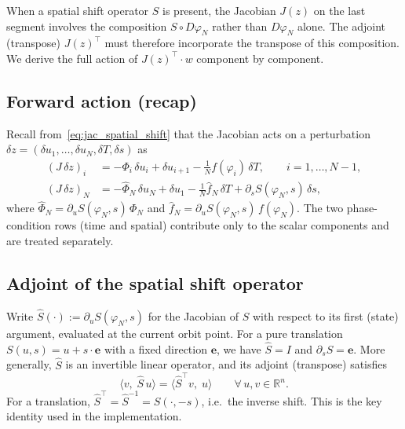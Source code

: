 \documentclass[11pt,a4paper]{article}
\begin{document}
When a spatial shift operator $S$ is present, the Jacobian $J(z)$ on the last segment
involves the composition $S \circ D\varphi_N$ rather than $D\varphi_N$ alone.  The adjoint
(transpose) $J(z)^\top$ must therefore incorporate the transpose of this composition.
We derive the full action of $J(z)^\top \cdot w$ component by component.

\subsection{Forward action (recap)}

Recall from~\eqref{eq:jac_spatial_shift} that the Jacobian acts on a perturbation
$\delta z = (\delta u_1, \dots, \delta u_N, \delta T, \delta s)$ as
\begin{align}
    (J\,\delta z)_i &= -\Phi_i\,\delta u_i + \delta u_{i+1}
                       - \tfrac{1}{N}f(\varphi_i)\,\delta T,
                       \qquad i = 1,\dots,N-1, \label{eq:jfw_inner} \\[4pt]
    (J\,\delta z)_N &= -\widehat{\Phi}_N\,\delta u_N + \delta u_1
                       - \tfrac{1}{N}\widehat{f}_N\,\delta T
                       + \partial_s S(\varphi_N,s)\,\delta s, \label{eq:jfw_last}
\end{align}
where $\widehat{\Phi}_N = \partial_u S(\varphi_N,s)\,\Phi_N$ and
$\widehat{f}_N = \partial_u S(\varphi_N,s)\,f(\varphi_N)$.  The two phase-condition
rows (time and spatial) contribute only to the scalar components and are treated
separately.

\subsection{Adjoint of the spatial shift operator}

Write $\widehat{S}(\cdot) := \partial_u S(\varphi_N, s)$ for the Jacobian of $S$
with respect to its first (state) argument, evaluated at the current orbit point.
For a pure translation $S(u,s) = u + s\cdot\mathbf{e}$ with a fixed direction
$\mathbf{e}$, we have $\widehat{S} = I$ and $\partial_s S = \mathbf{e}$.
More generally, $\widehat{S}$ is an invertible linear operator, and its
adjoint (transpose) satisfies
\begin{equation}
    \bigl\langle v,\; \widehat{S}\,u \bigr\rangle
    = \bigl\langle \widehat{S}^{\top} v,\; u \bigr\rangle
    \qquad \forall\, u,v \in \mathbb{R}^n.
\end{equation}
For a translation, $\widehat{S}^{\top} = \widehat{S}^{-1} = S(\cdot, -s)$, i.e.\ the
inverse shift.  This is the key identity used in the implementation.
\end{document}
